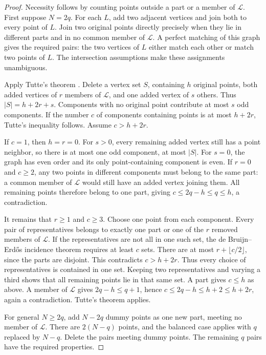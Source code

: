 \documentclass[11pt,a4paper]{article}
\theoremstyle{definition}
\begin{document}
\begin{proof}
Necessity follows by counting points outside a part or a member of
$\mathcal L$. First suppose $N=2q$. For each $L$, add two adjacent
vertices and join both to every point of $L$. Join two original points
directly precisely when they lie in different parts and in no common
member of $\mathcal L$. A perfect matching of this graph gives the
required pairs: the two vertices of $L$ either match each other or
match two points of $L$. The intersection assumptions make these
assignments unambiguous.

Apply Tutte's theorem \cite{Tutte}. Delete a vertex set $S$, containing
$h$ original points, both added vertices of $r$ members of $\mathcal L$,
and one added vertex of $s$ others. Thus $|S|=h+2r+s$. Components with
no original point contribute at most $s$ odd components. If the number
$c$ of components containing points is at most $h+2r$, Tutte's inequality
follows. Assume $c>h+2r$.

If $c=1$, then $h=r=0$. For $s>0$, every remaining added vertex still
has a point neighbor, so there is at most one odd component, at most
$|S|$. For $s=0$, the graph has even order and its only point-containing
component is even. If $r=0$ and $c\ge2$, any two points in different
components must belong to the same part: a common member of
$\mathcal L$ would still have an added vertex joining them. All remaining points therefore
belong to one part, giving $c\le2q-h\le q\le h$, a contradiction.

It remains that $r\ge1$ and $c\ge3$. Choose one point from each component.
Every pair of representatives belongs to exactly one part or one of
the $r$ removed members of $\mathcal L$. If the representatives are not
all in one such set, the de Bruijn--Erd\H{o}s incidence theorem
\cite{deBruijnErdos} requires at least $c$ sets. There are at most
$r+\lfloor c/2\rfloor$, since the parts are disjoint. This contradicts
$c>h+2r$. Thus every choice of representatives is contained in one set.
Keeping two representatives and varying a third shows that all remaining
points lie in that same set. A part gives $c\le h$ as above. A member of
$\mathcal L$ gives $2q-h\le q+1$, hence
$c\le2q-h\le h+2\le h+2r$, again a contradiction. Tutte's theorem applies.

For general $N\ge2q$, add $N-2q$ dummy points as one new part, meeting
no member of $\mathcal L$. There are $2(N-q)$ points, and the balanced
case applies with $q$ replaced by $N-q$. Delete the pairs meeting
dummy points. The remaining $q$ pairs have the required properties.
\end{proof}
\end{document}
